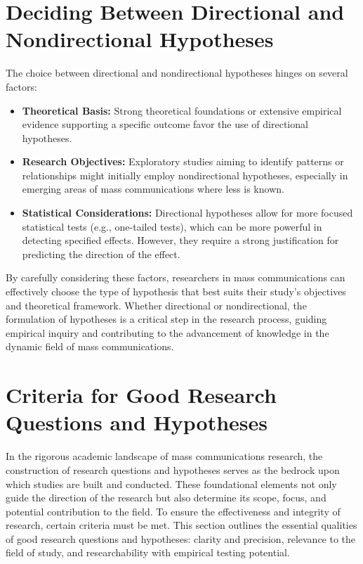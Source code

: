 \documentclass[
]{book}
\providecommand{\tightlist}{%
  \setlength{\itemsep}{0pt}\setlength{\parskip}{0pt}}
\begin{document}
\hypertarget{deciding-between-directional-and-nondirectional-hypotheses}{%
\section{Deciding Between Directional and Nondirectional Hypotheses}\label{deciding-between-directional-and-nondirectional-hypotheses}}

The choice between directional and nondirectional hypotheses hinges on several factors:

\begin{itemize}
\tightlist
\item
  \textbf{Theoretical Basis:} Strong theoretical foundations or extensive empirical evidence supporting a specific outcome favor the use of directional hypotheses.
\item
  \textbf{Research Objectives:} Exploratory studies aiming to identify patterns or relationships might initially employ nondirectional hypotheses, especially in emerging areas of mass communications where less is known.
\item
  \textbf{Statistical Considerations:} Directional hypotheses allow for more focused statistical tests (e.g., one-tailed tests), which can be more powerful in detecting specified effects. However, they require a strong justification for predicting the direction of the effect.
\end{itemize}

By carefully considering these factors, researchers in mass communications can effectively choose the type of hypothesis that best suits their study's objectives and theoretical framework. Whether directional or nondirectional, the formulation of hypotheses is a critical step in the research process, guiding empirical inquiry and contributing to the advancement of knowledge in the dynamic field of mass communications.

\hypertarget{criteria-for-good-research-questions-and-hypotheses}{%
\section{Criteria for Good Research Questions and Hypotheses}\label{criteria-for-good-research-questions-and-hypotheses}}

In the rigorous academic landscape of mass communications research, the construction of research questions and hypotheses serves as the bedrock upon which studies are built and conducted. These foundational elements not only guide the direction of the research but also determine its scope, focus, and potential contribution to the field. To ensure the effectiveness and integrity of research, certain criteria must be met. This section outlines the essential qualities of good research questions and hypotheses: clarity and precision, relevance to the field of study, and researchability with empirical testing potential.
\end{document}
